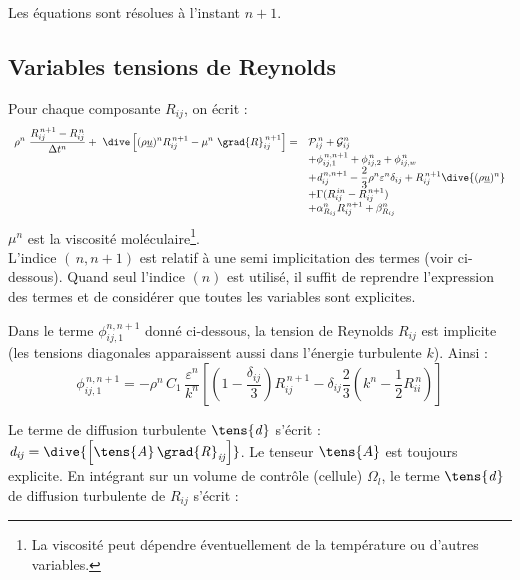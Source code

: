 Les \'equations sont r\'esolues \`a l'instant $n+1$.
\subsection*{\bf Variables tensions de Reynolds}
Pour chaque composante $R_{ij}$, on \'ecrit :
\begin{equation}\label{Base_Turrij_Eq_Temp_Rij}
\begin{array}{ll}
\displaystyle
\rho^n\ \frac {R_{ij}^{\,n+1}-R_{ij}^{\,n}}{\Delta t^n}
+\ \dive\left[ (\rho \underline{u})^{n} R_{ij}^{\,n+1}
- \mu^n\ \grad{R}_{ij}^{\,n+1} \right]
=  &
\displaystyle
\mathcal{P}^{\,n}_{ij}
+ \mathcal{G}^n_{ij} \\
&
\displaystyle
+ \phi^{\,n,n+1}_{ij,1} + \phi^{\,n}_{ij,2} + \phi^{\,n}_{ij,w} \\
&
\displaystyle
+ \text{\it{d}}^{\,n,n+1}_{ij}
- \displaystyle \frac{2}{3} \rho^n \varepsilon^n \delta_{ij}
+ R^{\,n+1}_{ij} \dive{(\rho \underline{u})^n} \\
&
\displaystyle
+ \Gamma(R^{\,in}_{ij} - R^{\,n+1}_{ij}) \\
&
\displaystyle
+ \alpha^n_{R_{ij}} R^{\,n+1}_{ij} + \beta^n_{R_{ij}}
\end{array}
\end{equation}
$\mu^n$ est la viscosit\'e mol\'eculaire\footnote{La viscosit\'e peut
d\'ependre \'eventuellement de la temp\'erature ou d'autres variables.}.\\
L'indice $(\,n,n+1)$ est relatif \`a une semi implicitation des termes (voir ci-dessous). Quand seul l'indice $(n)$ est utilis\'e, il suffit de reprendre l'expression des termes et de consid\'erer que toutes les variables sont explicites.

Dans le terme $\phi^{n,n+1}_{ij,1}$ donn\'e ci-dessous, la tension de Reynolds
 $R_{ij}$ est implicite (les tensions diagonales apparaissent aussi dans l'\'energie
turbulente $k$). Ainsi :
\begin{equation}
\displaystyle
\phi^{\,n,n+1}_{ij,1} = -\rho^n \,C_1\,\frac{\varepsilon^n}{k^n}\left[
(1-\frac{\delta_{ij}}{3}) R^{\,n+1}_{ij}- \delta_{ij} \frac{2}{3} (k^n-\frac{1}{2} R^{\,n}_{ii}) \right]
\end{equation}

Le terme de diffusion turbulente $\tens{\it{d}}$ s'\'ecrit : $\it{d}_{ij} = \dive{\left[ \tens{A}\,\grad{R}_{ij} \right]}$.
Le tenseur $\tens{A}$ est toujours explicite.
En int\'egrant sur un volume de contr\^ole (cellule) $\Omega_l$, le terme $\tens{\it{d}}$ de diffusion turbulente de $R_{ij}$ s'\'ecrit :

